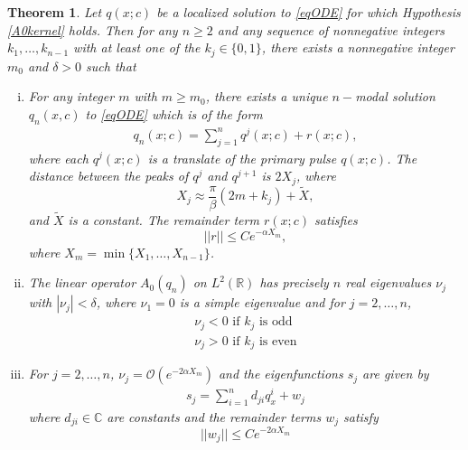 \documentclass[12pt]{article}
\def\R{{\mathbb R}}
\def\C{{\mathbb C}}
\newtheorem{theorem}{Theorem}
\begin{document}
\begin{theorem}\label{multiexist}
Let $q(x; c)$ be a localized solution to \eqref{eqODE} for which Hypothesis \ref{A0kernel} holds. Then for any $n \geq 2$ and any sequence of nonnegative integers $k_1, \dots, k_{n-1}$ with at least one of the $k_j \in \{0, 1 \}$, there exists a nonnegative integer $m_0$ and $\delta > 0$ such that
\begin{enumerate}[(i)]
	\item For any integer $m$ with $m \geq m_0$, there exists a unique $n-$modal solution $q_n(x, c)$ to \eqref{eqODE} which is of the form
	\begin{align}\label{qn}
	q_n(x; c) = \sum_{j = 1}^{n} q^j(x; c) + r(x; c),
	\end{align}
	where each $q^j(x; c)$ is a translate of the primary pulse $q(x; c)$. The distance between the peaks of $q^j$ and $q^{j+1}$ is $2 X_j$, where
	\begin{equation}
	X_j \approx \frac{\pi}{\beta}(2 m + k_j) + \tilde{X},
	\end{equation}
	and $\tilde{X}$ is a constant. The remainder term $r(x; c)$ satisfies
	\begin{equation}\label{rbound}
	||r|| \leq C e^{-\alpha X_m},
	\end{equation}
	where $X_m = \min\{X_1, \dots, X_{n-1}\}$.

	\item The linear operator $A_0(q_n)$ on $L^2(\R)$ has precisely $n$ real eigenvalues $\nu_j$ with $|\nu_j| < \delta$, where $\nu_1 = 0$ is a simple eigenvalue and for $j = 2, \dots, n$,
	\begin{align*}
	\nu_j < 0 \text{ if } k_j \text{ is odd} \\
	\nu_j > 0 \text{ if } k_j \text{ is even} 
	\end{align*}

	\item For $j = 2, \dots, n$, $\nu_j = \mathcal{O}(e^{-2\alpha X_m})$ and the eigenfunctions $s_j$ are given by
	\begin{align}\label{sj}
	s_j = \sum_{i = 1}^{n} d_{ji} q^i_x + w_j
	\end{align}
	where $d_{ji} \in \C$ are constants and the remainder terms $w_j$ satisfy
	\begin{equation}\label{sjwbound}
	||w_j|| \leq C e^{-2 \alpha X_m}
	\end{equation}

\end{enumerate}


\end{theorem}
\end{document}
